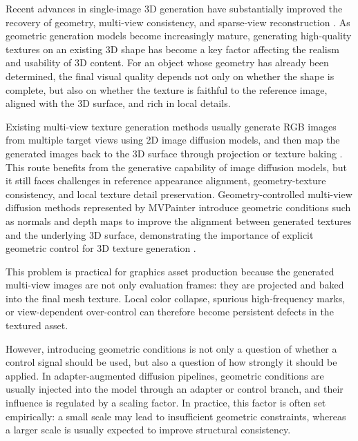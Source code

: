 \documentclass[times,twocolumn,final]{elsarticle}
\begin{document}
Recent advances in single-image 3D generation have substantially improved the recovery of geometry, multi-view consistency, and sparse-view reconstruction \cite{liu2023zero1to3,shi2023zero123pp,liu2023syncdreamer,long2023wonder3d,shi2024mvdream,wang2023imagedream,xu2024instantmesh,ke2024era3d}. As geometric generation models become increasingly mature, generating high-quality textures on an existing 3D shape has become a key factor affecting the realism and usability of 3D content. For an object whose geometry has already been determined, the final visual quality depends not only on whether the shape is complete, but also on whether the texture is faithful to the reference image, aligned with the 3D surface, and rich in local details.

Existing multi-view texture generation methods usually generate RGB images from multiple target views using 2D image diffusion models, and then map the generated images back to the 3D surface through projection or texture baking \cite{chen2023text2tex,richardson2023texture,poole2023dreamfusion,chen2023fantasia3d}. This route benefits from the generative capability of image diffusion models, but it still faces challenges in reference appearance alignment, geometry-texture consistency, and local texture detail preservation. Geometry-controlled multi-view diffusion methods represented by MVPainter introduce geometric conditions such as normals and depth maps to improve the alignment between generated textures and the underlying 3D surface, demonstrating the importance of explicit geometric control for 3D texture generation \cite{shao2025mvpainter}.

This problem is practical for graphics asset production because the generated multi-view images are not only evaluation frames: they are projected and baked into the final mesh texture. Local color collapse, spurious high-frequency marks, or view-dependent over-control can therefore become persistent defects in the textured asset.

However, introducing geometric conditions is not only a question of whether a control signal should be used, but also a question of how strongly it should be applied. In adapter-augmented diffusion pipelines, geometric conditions are usually injected into the model through an adapter or control branch, and their influence is regulated by a scaling factor. In practice, this factor is often set empirically: a small scale may lead to insufficient geometric constraints, whereas a larger scale is usually expected to improve structural consistency.
\end{document}
